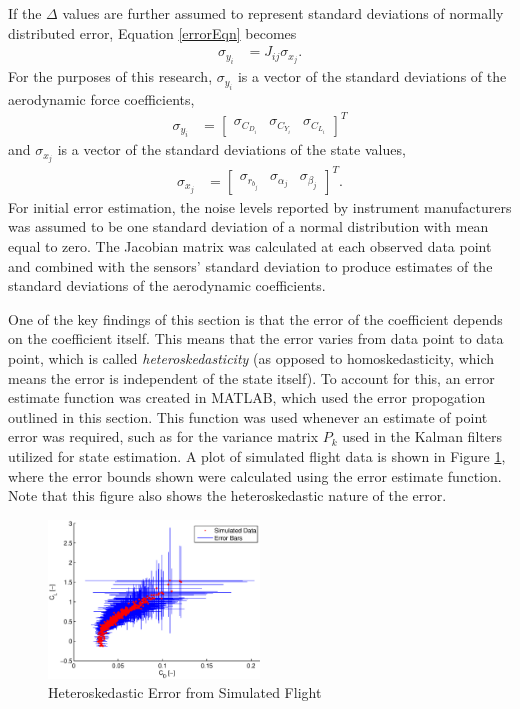 If the $\Delta$ values are further assumed to represent standard deviations of normally distributed error, Equation \ref{errorEqn} becomes
\begin{align}
\sigma_{y_i} &= J_{ij} \sigma_{x_j}.
\end{align}
For the purposes of this research, $\sigma_{y_i}$ is a vector of the standard deviations of the aerodynamic force coefficients,
\begin{align}
\sigma_{y_i} &= \begin{bmatrix} \sigma_{C_{D_i}} & \sigma_{C_{Y_i}} & \sigma_{C_{L_i}} \end{bmatrix}^T
\end{align}
\noindent
and $\sigma_{x_j}$ is a vector of the standard deviations of the state values,
\begin{align}
\sigma_{x_j} &= \begin{bmatrix} \sigma_{r_{b_j}} & \sigma_{\alpha_j} & \sigma_{\beta_j}\end{bmatrix}^T.
\end{align}
For initial error estimation, the noise levels reported by instrument manufacturers was assumed to be one standard deviation of a normal distribution with mean equal to zero. The Jacobian matrix was calculated at each observed data point and combined with the sensors' standard deviation to produce estimates of the standard deviations of the aerodynamic coefficients.

One of the key findings of this section is that the error of the coefficient depends on the coefficient itself. This means that the error varies from data point to data point, which is called \textit{heteroskedasticity} (as opposed to homoskedasticity, which means the error is independent of the state itself). To account for this, an error estimate function was created in MATLAB, which used the error propogation outlined in this section. This function was used whenever an estimate of point error was required, such as for the variance matrix $P_k$ used in the Kalman filters utilized for state estimation. A plot of simulated flight data is shown in Figure \ref{fig:errorBars}, where the error bounds shown were calculated using the error estimate function. Note that this figure also shows the heteroskedastic nature of the error.

\begin{figure}[H]
      \centering
   	  \includegraphics[width=0.5\textwidth]{figures/heteroskedasticity.eps}
      \caption{Heteroskedastic Error from Simulated Flight}
      \label{fig:errorBars}
\end{figure}


